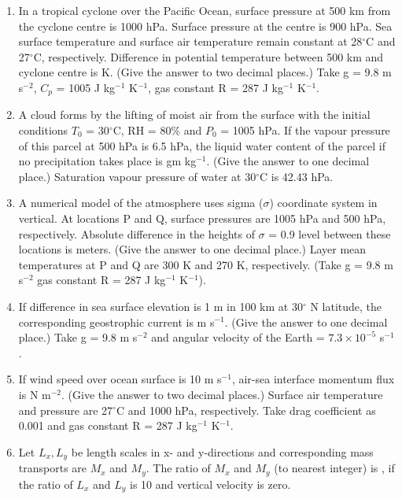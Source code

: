 \documentclass[a4paper,10pt]{article}
\begin{document}
\begin{enumerate}
    \item In a tropical cyclone over the Pacific Ocean, surface pressure at 500 km from the cyclone centre is 1000 hPa. Surface pressure at the centre is 900 hPa. Sea surface temperature and surface air temperature remain constant at 28$^{\circ}$C and 27$^{\circ}$C, respectively. Difference in potential temperature between 500 km and cyclone centre is \underline{\hspace{2cm}} K. (Give the answer to two decimal places.) Take g = 9.8 m s$^{-2}$, $C_p$ = 1005 J kg$^{-1}$ K$^{-1}$, gas constant R = 287 J kg$^{-1}$ K$^{-1}$.
    \hfill{}

    \item A cloud forms by the lifting of moist air from the surface with the initial conditions $T_0$ = 30$^{\circ}$C, RH = 80\% and $P_0$ = 1005 hPa. If the vapour pressure of this parcel at 500 hPa is 6.5 hPa, the liquid water content of the parcel if no precipitation takes place is \underline{\hspace{2cm}} gm kg$^{-1}$. (Give the answer to one decimal place.) Saturation vapour pressure of water at 30$^{\circ}$C is 42.43 hPa.
    \hfill{}

    \item A numerical model of the atmosphere uses sigma ($\sigma$) coordinate system in vertical. At locations P and Q, surface pressures are 1005 hPa and 500 hPa, respectively. Absolute difference in the heights of $\sigma$ = 0.9 level between these locations is \underline{\hspace{2cm}} meters. (Give the answer to one decimal place.) Layer mean temperatures at P and Q are 300 K and 270 K, respectively. (Take g = 9.8 m s$^{-2}$ gas constant R = 287 J kg$^{-1}$ K$^{-1}$).
    \hfill{}

    \item If difference in sea surface elevation is 1 m in 100 km at 30$^{\circ}$ N latitude, the corresponding geostrophic current is \underline{\hspace{2cm}} m s$^{-1}$. (Give the answer to one decimal place.) Take g = 9.8 m s$^{-2}$ and angular velocity of the Earth = $7.3 \times 10^{-5}$ s$^{-1}$.
    \hfill{}

    \item If wind speed over ocean surface is 10 m s$^{-1}$, air-sea interface momentum flux is \underline{\hspace{2cm}} N m$^{-2}$. (Give the answer to two decimal places.) Surface air temperature and pressure are 27$^{\circ}$C and 1000 hPa, respectively. Take drag coefficient as 0.001 and gas constant R = 287 J kg$^{-1}$ K$^{-1}$.
    \hfill{}

    \item Let $L_x, L_y$ be length scales in x- and y-directions and corresponding mass transports are $M_x$ and $M_y$. The ratio of $M_x$ and $M_y$ (to nearest integer) is \underline{\hspace{2cm}}, if the ratio of $L_x$ and $L_y$ is 10 and vertical velocity is zero.
    \hfill{}
\end{enumerate}
\end{document}
